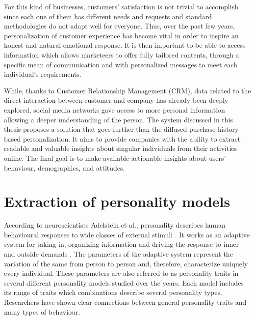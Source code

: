 For this kind of businesses, customers' satisfaction is not trivial to accomplish since each one of them has different needs and requests and standard methodologies do not adapt well for everyone.
Thus, over the past few years, personalization of customer experience has become vital in order to inspire an honest and natural emotional response.
It is then important to be able to access information which allows marketeers to offer fully tailored contents, through a specific mean of communication and with personalized messages to meet each individual's requirements.

While, thanks to Customer Relationship Management (CRM), data related to the direct interaction between customer and company has already been deeply explored, social media networks gave access to more personal information allowing a deeper understanding of the person.
The system discussed in this thesis proposes a solution that goes further than the diffused purchase history-based personalization.
It aims to provide companies with the ability to extract readable and valuable insights about singular individuals from their activities online.
The final goal is to make available actionable insights about users' behaviour, demographics, and attitudes.

\section{Extraction of personality models}
According to neuroscientists Adelstein et al., personality describes human behavioural responses to wide classes of external stimuli \cite{adelstein2011personality}. It works as an adaptive system for taking in, organizing information and driving the response to inner and outside demands \cite{block2002personality}.
The parameters of the adaptive system represent the variation of the same from person to person and, therefore, characterize uniquely every individual. These parameters are also referred to as personality traits in several different personality models studied over the years.
Each model includes its range of traits which combinations describe several personality types.
Researchers have shown clear connections between general personality traits and many types of behaviour.


